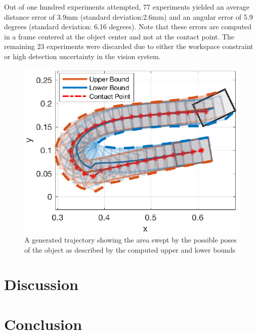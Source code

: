 \documentclass[conference]{IEEEtran}
\begin{document}
Out of one hundred experiments attempted, 77 experiments yielded an average distance error of 3.9mm (standard deviation:2.6mm) and an angular error of 5.9 degrees (standard deviation: 6.16 degrees). Note that these errors are computed in a frame centered at the object center and not at the contact point.
The remaining 23 experiments were discarded due to either the workspace constraint or high detection uncertainty in the vision system.



\begin{figure}
\begin{center}
  \includegraphics[width=\columnwidth]{fig/trajectory.eps}
\end{center}
\caption{A generated trajectory showing the area swept by the possible poses of the object as described by the computed upper and lower bounds}
\label{fig:trajectory}
\end{figure}






\section{Discussion}\label{sec:discussion}

\section{Conclusion}\label{sec:conclusion}



\end{document}
